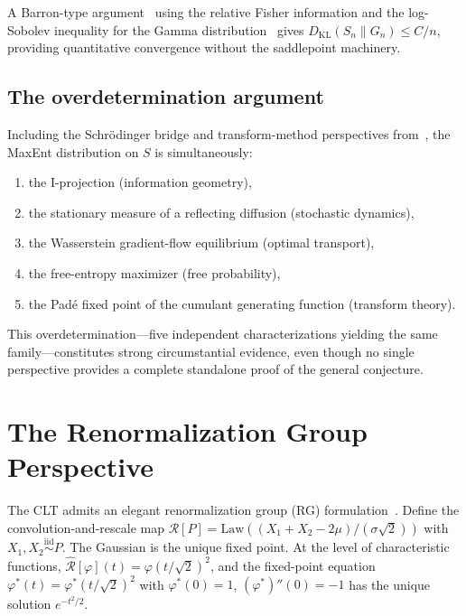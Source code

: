 \documentclass[aps,pre,twocolumn,superscriptaddress,nofootinbib]{revtex4-2}
\theoremstyle{definition}
\theoremstyle{remark}
\newcommand{\KL}{D_{\mathrm{KL}}}
\begin{document}
A Barron-type argument~\cite{Barron1986} using the relative Fisher information
and the log-Sobolev inequality for the Gamma
distribution~\cite{BobkovLedoux1997} gives $\KL(S_n\|G_n)\le C/n$, providing
quantitative convergence without the saddlepoint machinery.

\subsection{The overdetermination argument}

Including the Schr\"{o}dinger bridge and transform-method perspectives
from~\cite{alternative_perspectives}, the MaxEnt distribution on $S$ is
simultaneously:
\begin{enumerate}
\item the I-projection (information geometry),
\item the stationary measure of a reflecting diffusion (stochastic dynamics),
\item the Wasserstein gradient-flow equilibrium (optimal transport),
\item the free-entropy maximizer (free probability),
\item the Pad\'{e} fixed point of the cumulant generating function
(transform theory).
\end{enumerate}
This overdetermination---five independent characterizations yielding the same
family---constitutes strong circumstantial evidence, even though no single
perspective provides a complete standalone proof of the general conjecture.

\section{The Renormalization Group Perspective}\label{sec:rg}

The CLT admits an elegant renormalization group (RG)
formulation~\cite{JonaLasinio2001}.  Define the convolution-and-rescale map
$\mathcal{R}[P]=\mathrm{Law}((X_1{+}X_2{-}2\mu)/(\sigma\sqrt{2}))$ with
$X_1,X_2\stackrel{\text{iid}}{\sim}P$.  The Gaussian is the unique fixed
point.  At the level of characteristic functions,
$\hat{\mathcal{R}}[\varphi](t)=\varphi(t/\sqrt{2})^2$, and the fixed-point
equation $\varphi^*(t)=\varphi^*(t/\sqrt{2})^2$ with $\varphi^*(0)=1$,
$(\varphi^*)''(0)=-1$ has the unique solution $e^{-t^2/2}$.
\end{document}
